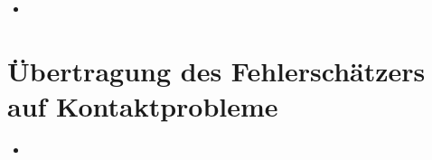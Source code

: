 \begin{itemize}
\item
\end{itemize}






\section{Übertragung des Fehlerschätzers auf Kontaktprobleme}
\label{kap:4.4}

\begin{itemize}
\item
\end{itemize}






\newpage

